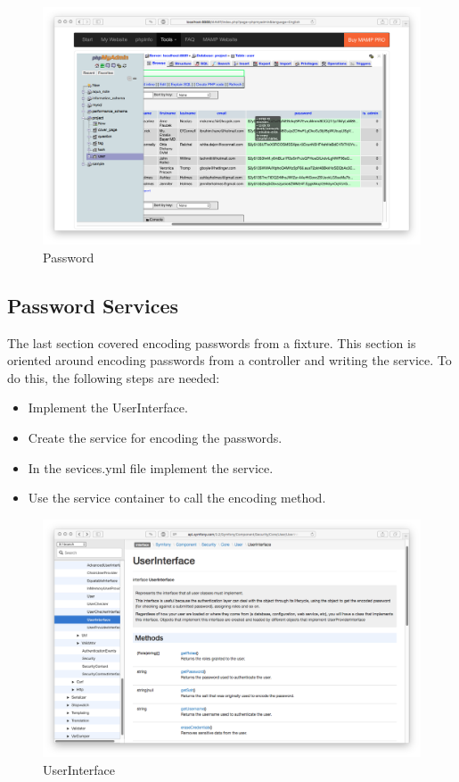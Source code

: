 \begin{figure}[htbp]
   \centering
   \includegraphics[width=400pt]{figures/password.png} %
   \caption{Password}
   \label{fig:Password}
\end{figure}

\subsection{Password Services}

The last section covered encoding passwords from a fixture. This section is oriented around encoding passwords from a controller and writing the service. To do this, the following steps are needed:

\begin{itemize}
  \item Implement the UserInterface.
    \item Create the service for encoding the passwords.
      \item In the sevices.yml file implement the service.
        \item Use the service container to call the encoding method.
\end{itemize}

\begin{figure}[htbp]
   \centering
   \includegraphics[width=400pt]{figures/user_interface.png} %
   \caption{UserInterface}
   \label{fig:UserInterface}
\end{figure}

